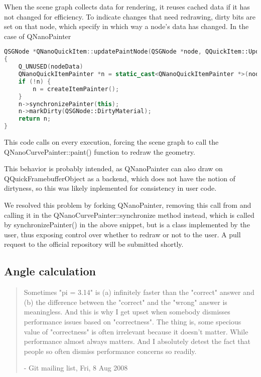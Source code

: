 When the scene graph collects data for rendering, it reuses cached data if it has not changed for efficiency. To indicate changes that need redrawing, dirty bits are set on that node, which specify in which way a node's data has changed. In the case of QNanoPainter 

\begin{lstlisting}[language=c++,caption=QNanoQuickItem as of commit de45f31e]
QSGNode *QNanoQuickItem::updatePaintNode(QSGNode *node, QQuickItem::UpdatePaintNodeData *nodeData)
{
    Q_UNUSED(nodeData)
    QNanoQuickItemPainter *n = static_cast<QNanoQuickItemPainter *>(node);
    if (!n) {
        n = createItemPainter();
    }
    n->synchronizePainter(this);
    n->markDirty(QSGNode::DirtyMaterial);
    return n;
}
\end{lstlisting}
This code calls  on every execution, forcing the scene graph to call the QNanoCurvePainter::paint() function to redraw the geometry.

This behavior is probably intended, as QNanoPainter can also draw on QQuickFramebufferObject as a backend, which does not have the notion of dirtyness, so this was likely inplemented for consistency in user code.

We resolved this problem by forking QNanoPainter, removing this call from  and calling it in the QNanoCurvePainter::synchronize method instead, which is called by synchronizePainter() in the above snippet, but is a class implemented by the user, thus exposing control over whether to redraw or not to the user. A pull request to the official repository will be submitted shortly.

\subsection{Angle calculation}
\begin{quote}
Sometimes "pi = 3.14" is (a) infinitely faster than the "correct" answer and (b) the difference between the "correct" and the "wrong" answer is meaningless. And this is why I get upset when somebody dismisses performance issues based on "correctness". The thing is, some specious value of "correctness" is often irrelevant because it doesn't matter. While performance almost always matters. And I absolutely detest the fact that people so often dismiss performance concerns so readily.

- Git mailing list, Fri, 8 Aug 2008
\end{quote}

